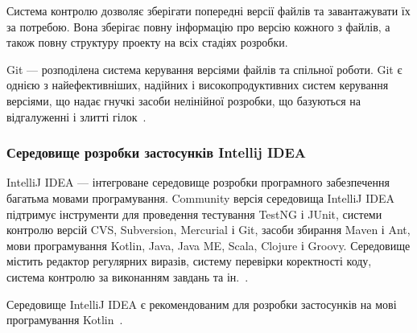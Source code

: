 Система контролю дозволяє зберігати попередні версії файлів та завантажувати їх за потребою. 
Вона зберігає повну інформацію про версію кожного з файлів, а також повну структуру проекту на всіх стадіях розробки.

Git --- розподілена система керування версіями файлів та спільної роботи. Git є однією з найефективніших, надійних і високопродуктивних систем керування версіями, що надає гнучкі засоби нелінійної розробки, що базуються на відгалуженні і злитті гілок~\cite{Chacon2009}.

\subsubsection{Середовище розробки застосунків Intellij IDEA}
IntelliJ IDEA --- інтегроване середовище розробки програмного забезпечення багатьма мовами програмування. 
Community версія середовища IntelliJ IDEA підтримує інструменти для проведення тестування TestNG і JUnit, системи контролю версій CVS, Subversion, Mercurial і Git, засоби збирання Maven і Ant, мови програмування Kotlin, Java, Java ME, Scala, Clojure і Groovy. 
Середовище містить редактор регулярних виразів, систему перевірки коректності коду, система контролю за виконанням завдань та ін.~\cite{Kalinichenko2013}.

Середовище IntelliJ IDEA є рекомендованим для розробки застосунків на мові програмування Kotlin~\cite{kotlin}.
